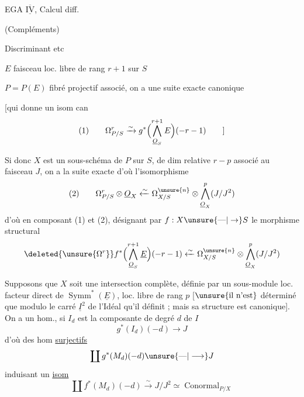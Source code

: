 
EGA $\overline{\underline{\mathrm{IV}}}$, Calcul diff.

(Compléments)



Discriminant etc



$E$ faisceau loc. libre de rang $r+1$ sur $S$

$P=P(E)$ fibré projectif associé, on a une suite exacte canonique

[qui donne un isom can
\[
(1)\qquad\Omega^r_{P/S}\xrightarrow{\sim}g^*\Bigl(\bigwedge_{\underline O_S}^{r+1}E\Bigr)(-r-1)
\qquad]
\]

Si donc $X$ est un sous-schéma de $P$  sur $S$, de dim relative $r-p$
associé au faisceau   $J$, on a la suite exacte
d'où l'isomorphisme
\[
(2)\qquad\Omega^r_{P/S}\otimes\underline O_X
\xleftarrow{\sim}\Omega^{\unsure{n}}_{X/S}\otimes\bigwedge_{\underline O_X}^p(J/J^2)
\]
d'où en composant (1) et (2), désignant par $f:X\unsure{\text{---}|\to}S$
le morphisme structural
\[
\deleted{\unsure{\Omega^r}}
f^*\Bigl(\bigwedge_{\underline O_S}^{r+1}\underline E\Bigr)(-r-1)
\xleftarrow{\sim}\Omega^{\unsure{n}}_{X/S}\otimes\bigwedge_{\underline O_X}^p(J/J^2)
\]

Supposons que $X$ soit une intersection complète, définie
par un sous-module  loc. facteur direct de
$\operatorname{Symm}^*(\underline E)$,
\deleted{[qui est \unsure{un}} loc. libre de rang $p$
[$\unsure{\text{il n'est}}$ 
déterminé que modulo le carré $\underline I^2$ de l'Idéal qu'il
définit ; mais sa structure est canonique]. On a
un hom., si $I_d$ est la composante de degré $d$ de $I$
\[
g^*(I_d)(-d)\longrightarrow J
\]
d'où des hom \uline{surjectifs}
\[
\coprod g^*(M_d)(-d)\unsure{\text{---}|\longrightarrow}J
\]
induisant un \uline{isom}
\[
\coprod f^*(M_d)(-d)\xrightarrow{\sim}J/J^2\simeq\operatorname{Conormal}_{P/X}
\]

